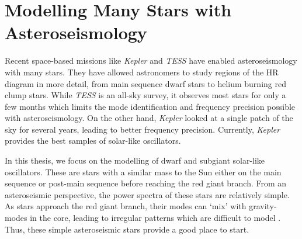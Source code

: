 


\section[Modelling Stars with Asteroseismology]{Modelling Many Stars with Asteroseismology}\label{sec:many-stars}

Recent space-based missions like \emph{Kepler} and \emph{TESS} have enabled asteroseismology with many stars. They have allowed astronomers to study regions of the HR diagram in more detail, from main sequence dwarf stars to helium burning red clump stars. While \emph{TESS} is an all-sky survey, it observes most stars for only a few months which limits the mode identification and frequency precision possible with asteroseismology. On the other hand, \emph{Kepler} looked at a single patch of the sky for several years, leading to better frequency precision. Currently, \emph{Kepler} provides the best samples of solar-like oscillators.


In this thesis, we focus on the modelling of dwarf and subgiant solar-like oscillators. These are stars with a similar mass to the Sun either on the main sequence or post-main sequence before reaching the red giant branch. From an asteroseismic perspective, the power spectra of these stars are relatively simple. As stars approach the red giant branch, their modes can `mix' with gravity-modes in the core, leading to irregular patterns which are difficult to model \needcite. Thus, these simple asteroseismic stars provide a good place to start.

